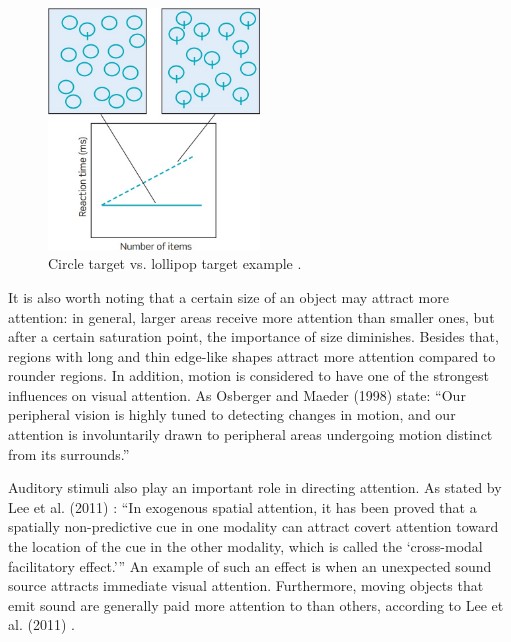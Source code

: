 \begin{figure}[h!]
	\centering
	\includegraphics[width=0.5\textwidth]{figures/circle_lollipop_example.jpg}
	\caption{Circle target vs. lollipop target example \cite{snowden2012basic}.}\label{fig:circle_lollipop_example}
\end{figure}

It is also worth noting that a certain size of an object may attract more attention: in general, larger areas receive more attention than smaller ones, but after a certain saturation point, the importance of size diminishes. Besides that, regions with long and thin edge-like shapes attract more attention compared to rounder regions. In addition, motion is considered to have one of the strongest influences on visual attention. As Osberger and Maeder (1998) \cite{osberger1998automatic} state: “Our peripheral vision is highly tuned to detecting changes in motion, and our attention is involuntarily drawn to peripheral areas undergoing motion distinct from its surrounds.”

Auditory stimuli also play an important role in directing attention. As stated by Lee et al. (2011) \cite{Lee2011704}: “In exogenous spatial attention, it has been proved that a spatially non-predictive cue in one modality can attract covert attention toward the location of the cue in the other modality, which is called the ‘cross-modal facilitatory effect.’” An example of such an effect is when an unexpected sound source attracts immediate visual attention. Furthermore, moving objects that emit sound are generally paid more attention to than others, according to Lee et al. (2011) \cite{lee2011efficient}.

